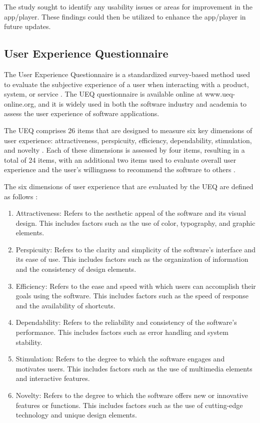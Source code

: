 \documentclass[conference,onecolumn]{IEEEtran}
\begin{document}
            The study sought to identify any usability issues or areas for improvement in the app/player. These findings could then be utilized to enhance the app/player in future updates.
                
    \subsection{User Experience Questionnaire}
    
        The User Experience Questionnaire is a standardized survey-based method used to evaluate the subjective experience of a user when interacting with a product, system, or service \cite{brooke1996sus}. The UEQ questionnaire is available online at www.ueq-online.org, and it is widely used in both the software industry and academia to assess the user experience of software applications.

        The UEQ comprises 26 items that are designed to measure six key dimensions of user experience: attractiveness, perspicuity, efficiency, dependability, stimulation, and novelty \cite{hassenzahl2006user}. Each of these dimensions is assessed by four items, resulting in a total of 24 items, with an additional two items used to evaluate overall user experience and the user's willingness to recommend the software to others \cite{laugwitz2008construction}.

        The six dimensions of user experience that are evaluated by the UEQ are defined as follows \cite{hassenzahl2003attrakdiff}:

        \begin{enumerate}
            \item	Attractiveness: Refers to the aesthetic appeal of the software and its visual design. This includes factors such as the use of color, typography, and graphic elements.
            \item	Perspicuity: Refers to the clarity and simplicity of the software's interface and its ease of use. This includes factors such as the organization of information and the consistency of design elements.
            \item	Efficiency: Refers to the ease and speed with which users can accomplish their goals using the software. This includes factors such as the speed of response and the availability of shortcuts.
            \item	Dependability: Refers to the reliability and consistency of the software's performance. This includes factors such as error handling and system stability.
            \item	Stimulation: Refers to the degree to which the software engages and motivates users. This includes factors such as the use of multimedia elements and interactive features.
            \item	Novelty: Refers to the degree to which the software offers new or innovative features or functions. This includes factors such as the use of cutting-edge technology and unique design elements.
        \end{enumerate}
        
\end{document}
